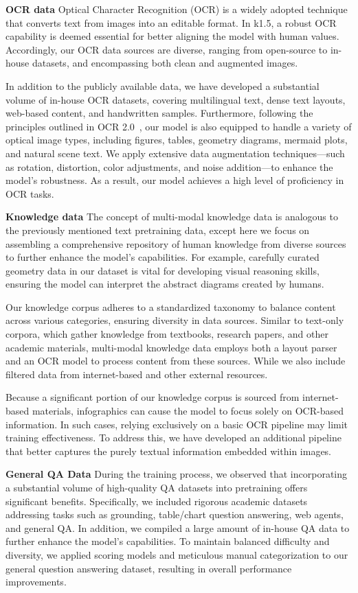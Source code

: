 \documentclass{article}
\newcommand{\citep}[1]{\parencite{#1}}
\begin{document}
\textbf{OCR data} 
Optical Character Recognition (OCR) is a widely adopted technique that converts text from images into an editable format. In k1.5, a robust OCR capability is deemed essential for better aligning the model with human values. Accordingly, our OCR data sources are diverse, ranging from open-source to in-house datasets, and encompassing both clean and augmented images.

In addition to the publicly available data, we have developed a substantial volume of in-house OCR datasets, covering multilingual text, dense text layouts, web-based content, and handwritten samples. 
Furthermore, following the principles outlined in OCR 2.0~\citep{wei2024general}, our model is also equipped to handle a variety of optical image types, including figures, tables, geometry diagrams, mermaid plots, and natural scene text. We apply extensive data augmentation techniques—such as rotation, distortion, color adjustments, and noise addition—to enhance the model’s robustness. As a result, our model achieves a high level of proficiency in OCR tasks.

\textbf{Knowledge data} The concept of multi-modal knowledge data is analogous to the previously mentioned text pretraining data, except here we focus on assembling a comprehensive repository of human knowledge from diverse sources to further enhance the model's capabilities. 
For example, carefully curated geometry data in our dataset is vital for developing visual reasoning skills, ensuring the model can interpret the abstract diagrams created by humans.

Our knowledge corpus adheres to a standardized taxonomy to balance content across various categories, ensuring diversity in data sources. Similar to text-only corpora, which gather knowledge from textbooks, research papers, and other academic materials, multi-modal knowledge data employs both a layout parser and an OCR model to process content from these sources. While we also include filtered data from internet-based and other external resources.

Because a significant portion of our knowledge corpus is sourced from internet-based materials, infographics can cause the model to focus solely on OCR-based information. In such cases, relying exclusively on a basic OCR pipeline may limit training effectiveness. To address this, we have developed an additional pipeline that better captures the purely textual information embedded within images.

\textbf{General QA Data}  
During the training process, we observed that incorporating a substantial volume of high-quality QA datasets into pretraining offers significant benefits. Specifically, we included rigorous academic datasets addressing tasks such as grounding, table/chart question answering, web agents, and general QA. In addition, we compiled a large amount of in-house QA data to further enhance the model’s capabilities. To maintain balanced difficulty and diversity, we applied scoring models and meticulous manual categorization to our general question answering dataset, resulting in overall performance improvements.
\end{document}
